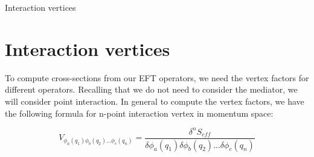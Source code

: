 \documentclass[11pt]{beamer}
\begin{document}
\begin{frame}{Interaction vertices}

\section{Interaction vertices}
To compute cross-sections from our EFT operators, we need the vertex factors for different operators. Recalling that we do not need to consider the mediator, we will consider point interaction.
In general to compute the vertex factors, we have the following formula for n-point interaction vertex in momentum space:

\begin{equation*}
V_{\phi_a(q_1) \phi_b(q_2)...\phi_c(q_n)} = \frac{\delta^nS_{eff}}{\delta \phi_a(q_1) \delta\phi_b(q_2)... \delta \phi_c(q_n)}
\end{equation*}

\end{frame}
\end{document}
